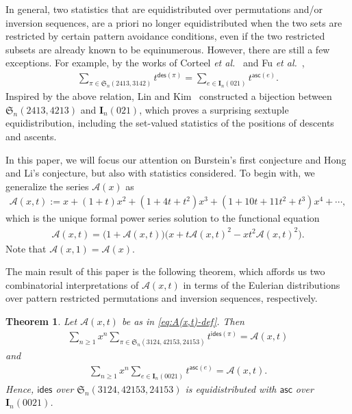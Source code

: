 \documentclass[reqno]{amsart}
\numberwithin{equation}{section}
\theoremstyle{plain}
\newtheorem{theorem}{Theorem}[section]
\theoremstyle{definition}
\theoremstyle{named}
\newcommand{\fS}{\mathfrak{S}}
\newcommand{\bI}{\mathbf{I}}
\newcommand{\asc}{\mathsf{asc}}
\newcommand{\des}{\mathsf{des}}
\newcommand{\ides}{\mathsf{ides}}
\newcommand{\cA}{\mathcal{A}}
\begin{document}
In general, two statistics that are equidistributed over permutations and/or inversion sequences, are a priori no longer equidistributed when the two sets are restricted by certain pattern avoidance conditions, even if the two restricted subsets are already known to be equinumerous. However, there are still a few exceptions. For example, by the works of Corteel \textit{et al.}~\cite{CMSW2016} and Fu \textit{et al.}~\cite{FLZ2018},
\begin{align}\label{eq:C-F}
	\sum_{\pi\in\fS_n(2413,3142)}t^{\des(\pi)} = \sum_{e\in\bI_n(021)} t^{\asc(e)}.
\end{align}
Inspired by the above relation,  Lin and Kim~\cite{LK2018} constructed a bijection between $\fS_n(2413,4213)$ and $\bI_n(021)$, which proves a surprising sextuple equidistribution, including the set-valued statistics of the positions of  descents and ascents.

In this paper, we will focus our attention on Burstein's first conjecture and Hong and Li's conjecture, but also with statistics considered. To begin with, we generalize the series $\cA(x)$ as
\begin{align}\label{eq:A(x,t)-def}
	\cA(x,t):=x + (1 + t) x^2 + (1 + 4 t + t^2) x^3 + (1 + 10 t + 11 t^2 + t^3) x^4 + \cdots,
\end{align}
which is the unique formal power series solution to the functional equation
\begin{align}\label{eq:A(x,t)-eqn}
	\cA(x,t)=\big(1+\cA(x,t)\big)\big(x+t \cA(x,t)^2 - xt^2 \cA(x,t)^2\big).
\end{align}
Note that $\cA(x,1)=\cA(x)$. 

The main result of this paper is the following theorem, which affords us two combinatorial interpretations of $\cA(x,t)$ in terms of the Eulerian distributions over pattern restricted permutations and inversion sequences, respectively.

\begin{theorem}
	Let $\cA(x,t)$ be as in \eqref{eq:A(x,t)-def}. Then
	\begin{align}\label{eq:P-gf}
		\sum_{n\ge 1}x^n\sum_{\pi\in\fS_n(3124, 42153, 24153)}t^{\ides(\pi)} = \cA(x,t)
	\end{align}
	and
	\begin{align}\label{eq:I-gf}
		\sum_{n\ge 1}x^n\sum_{e\in\bI_n(0021)}t^{\asc(e)} = \cA(x,t).
	\end{align}
	Hence, $\ides$ over $\fS_n(3124, 42153, 24153)$ is equidistributed with $\asc$ over $\bI_n(0021)$.
\end{theorem}
\end{document}
